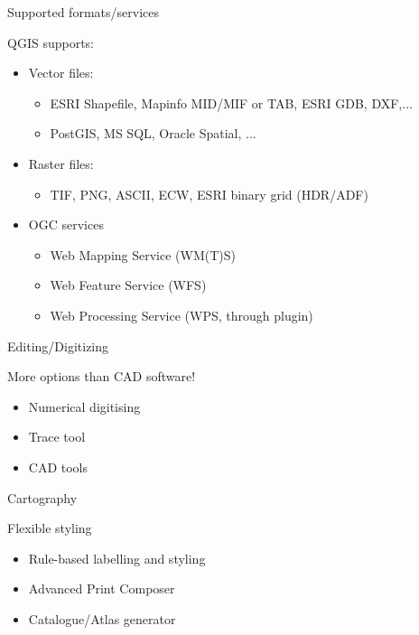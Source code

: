 \begin{frame}{Supported formats/services}
	\begin{block}{QGIS supports:}
		\begin{itemize}
			\item Vector files:
			\begin{itemize}
				\item ESRI Shapefile, Mapinfo MID/MIF or TAB, ESRI GDB, DXF,...
				\item PostGIS, MS SQL, Oracle Spatial, ...
			\end{itemize}	
			\item Raster files:
			\begin{itemize}
				\item TIF, PNG, ASCII, ECW, ESRI binary grid (HDR/ADF)
			\end{itemize}
			\item OGC services
			\begin{itemize}
				\item Web Mapping Service (WM(T)S)
				\item Web Feature Service (WFS)
				\item Web Processing Service (WPS, through plugin)
			\end{itemize}
		\end{itemize}
	\end{block}
\end{frame}

\begin{frame}{Editing/Digitizing}
	\begin{block}{More options than CAD software!}
		\begin{itemize}
			\item Numerical digitising
			\item Trace tool
			\item CAD tools
		\end{itemize}
	\end{block}
\end{frame}

\begin{frame}{Cartography}
	\begin{block}{Flexible styling}
		\begin{itemize}
			\item Rule-based labelling and styling
			\item Advanced Print Composer
			\item Catalogue/Atlas generator
		\end{itemize}
	\end{block}
\end{frame}

